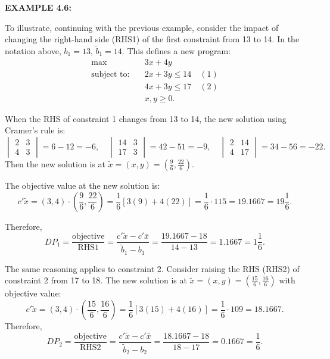 \bigskip
\noindent\textbf{EXAMPLE 4.6:}
\begin{original}
To illustrate, continuing with the previous example, consider the impact of changing the right-hand side (RHS1) of the first constraint from 13 to 14. In the notation above, $b_1 = 13$, $\tilde{b}_1 = 14$. This defines a new program:
\[
\begin{aligned}
\max \quad & 3x + 4y \\
\text{subject to:} \quad & 2x + 3y \le 14 \quad (1) \\
& 4x + 3y \le 17 \quad (2) \\
& x, y \ge 0.
\end{aligned}
\]

When the RHS of constraint 1 changes from 13 to 14, the new solution using Cramer's rule is:
\[
\begin{vmatrix} 2 & 3 \\ 4 & 3 \end{vmatrix} = 6 - 12 = -6,\quad
\begin{vmatrix} 14 & 3 \\ 17 & 3 \end{vmatrix} = 42 - 51 = -9,\quad
\begin{vmatrix} 2 & 14 \\ 4 & 17 \end{vmatrix} = 34 - 56 = -22.
\]
Then the new solution is at $\tilde{x} = (x, y) = \left(\frac{9}{6}, \frac{22}{6}\right)$.

The objective value at the new solution is:
\[
c'\tilde{x} = (3,4) \cdot \left(\frac{9}{6}, \frac{22}{6}\right) = \frac{1}{6}[3(9) + 4(22)] = \frac{1}{6} \cdot 115 = 19.1667 = 19\frac{1}{6}.
\]

Therefore,
\[
DP_1 = \frac{\text{objective}}{\text{RHS1}} = \frac{c'\tilde{x} - c'\bar{x}}{\tilde{b}_1 - b_1} = \frac{19.1667 - 18}{14 - 13} = 1.1667 = 1\frac{1}{6}.
\]

The same reasoning applies to constraint 2. Consider raising the RHS (RHS2) of constraint 2 from 17 to 18. The new solution is at $\tilde{x} = (x, y) = \left(\frac{15}{6}, \frac{16}{6}\right)$ with objective value:
\[
c'\tilde{x} = (3,4) \cdot \left(\frac{15}{6}, \frac{16}{6}\right) = \frac{1}{6}[3(15) + 4(16)] = \frac{1}{6} \cdot 109 = 18.1667.
\]
Therefore,
\[
DP_2 = \frac{\text{objective}}{\text{RHS2}} = \frac{c'\tilde{x} - c'\bar{x}}{\tilde{b}_2 - b_2} = \frac{18.1667 - 18}{18 - 17} = 0.1667 = \frac{1}{6}.
\]
\end{original}
